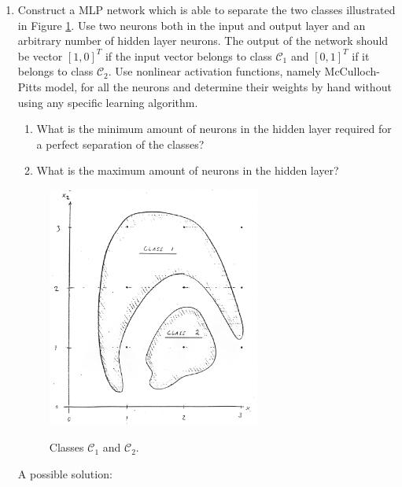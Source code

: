 \begin{enumerate}

\item Construct a MLP network which is able to separate the two
  classes illustrated in Figure \ref{61}. Use two neurons both in the input
  and output layer and an arbitrary number of hidden layer
  neurons. The output of the network should be vector $\left[ 1,
    0\right]^T$ if the input vector belongs to class $\mathcal{C}_1$ and  $\left[ 0,
    1\right]^T$ if it belongs to class $\mathcal{C}_2$. Use nonlinear activation
  functions, namely McCulloch-Pitts model, for all the neurons and
  determine their weights by hand without using any specific learning
  algorithm.
  \begin{enumerate}
  \item What is the minimum amount of neurons in the hidden layer
    required for a perfect separation of the classes?
  \item What is the maximum amount of neurons in the hidden layer?
  \end{enumerate}

  \begin{figure}[hbp]
    \centering
    \includegraphics[width=7cm]{mlp_classification.ps}
    \label{61}
    \caption{Classes $\mathcal{C}_1$ and $\mathcal{C}_2$.}
  \end{figure}

  \begin{solution}

    A possible solution:



\end{solution}
\end{enumerate}
